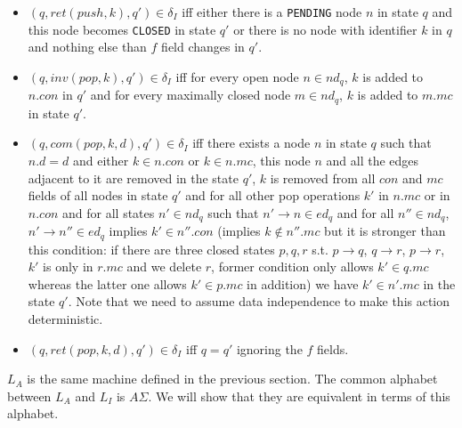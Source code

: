 \begin{itemize}
\begin{itemize}
\item $(q, ret(push,k),q') \in \delta_I$ iff either there is a \texttt{PENDING} node $n$ in state $q$ and this node becomes \texttt{CLOSED} in state $q'$ or there is no node with identifier $k$ in $q$ and nothing else than $f$ field changes in $q'$.
\item $(q, inv(pop,k),q') \in \delta_I$ iff for every open node $n \in nd_q$, $k$ is added to $n.con$ in $q'$ and for every maximally closed node $m \in nd_q$, $k$ is added to $m.mc$ in state $q'$. 
\item $(q, com(pop,k,d), q') \in \delta_I$ iff there exists a node $n$ in state $q$ such that $n.d = d$ and either $k \in n.con$ or $k \in n.mc$, this node $n$ and all the edges adjacent to it are removed in the state $q'$, $k$ is removed from all $con$ and $mc$ fields of all nodes in state $q'$ and for all other pop operations $k'$ in $n.mc$ or in $n.con$ and for all states $n' \in nd_q$ such that $n' \rightarrow n \in ed_q$ and for all $n'' \in nd_q$, $n' \rightarrow n'' \in ed_q$ implies $k' \in n''.con$ (implies $k \notin n''.mc$ but it is stronger than this condition: if there are three closed states $p,q,r$ s.t. $p \rightarrow q$, $q \rightarrow r$, $p \rightarrow r$, $k'$ is only in $r.mc$ and we delete $r$, former condition only allows $k' \in q.mc$ whereas the latter one allows $k' \in p.mc$ in addition) we have $k' \in n'.mc$ in the state $q'$. Note that we need to assume data independence to make this action deterministic.
\item $(q, ret(pop,k,d), q') \in \delta_I$ iff $q=q'$ ignoring the $f$ fields.
\end{itemize}
\end{itemize}
$L_A$ is the same machine defined in the previous section. The common alphabet between $L_A$ and $L_I$ is $A\Sigma$. We will show that they are equivalent in terms of this alphabet.

